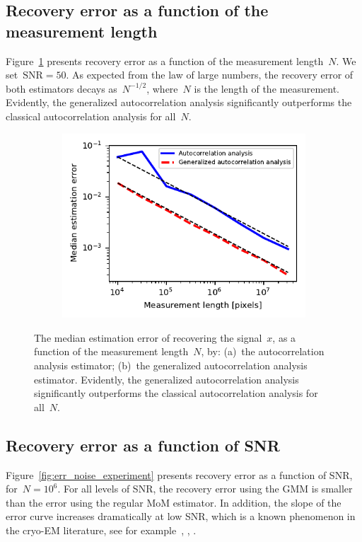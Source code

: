 \documentclass{article}
\begin{document}
\subsection{Recovery error as a function of the measurement length}
\label{subsec:exp_size}
Figure~\ref{fig:err_size_experiment} presents recovery error as a function of the measurement length~$N$. We set~\mbox{$\text{SNR} = 50$}. As expected from the law of large numbers, the recovery error of both estimators decays as~$N^{-1/2}$, where~$N$ is the length of the measurement. Evidently, the generalized autocorrelation analysis significantly outperforms the classical autocorrelation analysis for all~$N$.

\begin{figure}[!tb]
	\begin{subfigure}[ht]{\columnwidth}
		\centering
		\includegraphics[width=\columnwidth]{figures/experiment_size_err.pdf}
	\end{subfigure}
	\caption{The median estimation error of recovering the signal~$x$, as a function of the measurement length~$N$, by: (a)~the autocorrelation analysis estimator; (b)~the generalized autocorrelation analysis estimator. Evidently, the generalized autocorrelation analysis significantly outperforms the classical autocorrelation analysis for all~$N$.}
\label{fig:err_size_experiment}
\end{figure}

\subsection{Recovery error as a function of SNR}
\label{subsec:exp_SNR}
Figure~\ref{fig:err_noise_experiment} presents recovery error as a function of SNR, for~$N = 10^6$. For all levels of SNR, the recovery error using the GMM is smaller than the error using the regular MoM estimator. In addition, the slope of the error curve increases dramatically at low SNR, which is a known phenomenon in the \mbox{cryo-EM} literature, see for example~\cite{sigworth1998maximum}, \cite{abbe2018multireference}, \cite{perry2019sample}.
\end{document}
